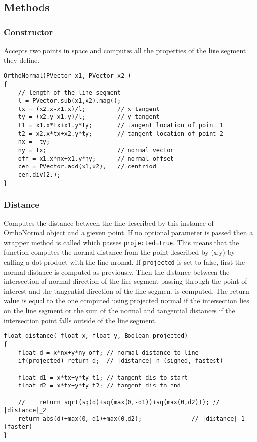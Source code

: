 \documentclass[notitlepage]{article}
\begin{document}
\subsection{Methods}

\subsubsection{Constructor}

Accepts two points in space and computes all the properties of the line segment they define.

\begin{lstlisting}[style=myCpp]
OrthoNormal(PVector x1, PVector x2 )
{
	// length of the line segment
	l = PVector.sub(x1,x2).mag();
	tx = (x2.x-x1.x)/l;    		// x tangent
	ty = (x2.y-x1.y)/l;    		// y tangent
	t1 = x1.x*tx+x1.y*ty;  		// tangent location of point 1
	t2 = x2.x*tx+x2.y*ty;  		// tangent location of point 2
	nx = -ty;
	ny = tx;     				// normal vector
	off = x1.x*nx+x1.y*ny; 		// normal offset
	cen = PVector.add(x1,x2);	// centriod
	cen.div(2.);
}
\end{lstlisting}

\subsubsection{Distance}

Computes the distance between the line described by this instance of OrthoNormal object
and a gieven point. If no optional parameter is passed then a wrapper method is called
which passes \texttt{projected=true}. This means that the function computes the normal
distance from the point described by (x,y) by calling a dot product with the line nromal.
If \texttt{projected} is set to false, first the normal distance is computed as previously.
Then the distance between the intersection of normal direction of the line segment passing
through the point of interest and the tangential direction of the line segment is computed.
The return value is equal to the one computed using projected normal if the intersection
lies on the line segment or the sum of the normal and tangential distances if the
intersection point falls outside of the line segment.

\begin{lstlisting}[style=myCpp]
float distance( float x, float y, Boolean projected)
{
	float d = x*nx+y*ny-off; // normal distance to line 
	if(projected) return d;  // |distance|_n (signed, fastest)

	float d1 = x*tx+y*ty-t1; // tangent dis to start
	float d2 = x*tx+y*ty-t2; // tangent dis to end

	//    return sqrt(sq(d)+sq(max(0,-d1))+sq(max(0,d2))); // |distance|_2
	return abs(d)+max(0,-d1)+max(0,d2);              // |distance|_1 (faster)
}
\end{lstlisting}
\end{document}
